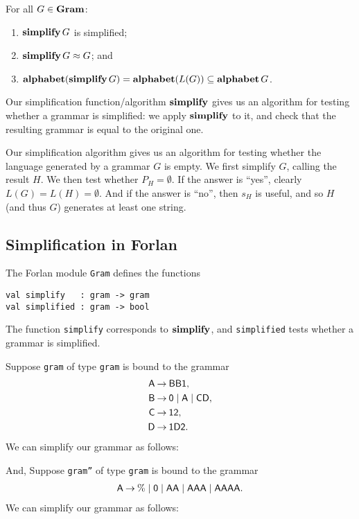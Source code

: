 \begin{theorem}
For all $G\in\mathbf{Gram}$:
\begin{enumerate}[\quad(1)]
\item $\mathbf{simplify}\,G$ is simplified;

\item $\mathbf{simplify}\,G\approx G$; and

\item $\mathbf{alphabet}(\mathbf{simplify}\,G) = \mathbf{alphabet}(L(G)) \subseteq\mathbf{alphabet}\,G$.
\end{enumerate}
\end{theorem}

Our simplification function/algorithm $\mathbf{simplify}$ gives us an
algorithm for testing whether a grammar is simplified: we apply
$\mathbf{simplify}$ to it, and check that the resulting grammar is equal to
the original one.

Our simplification algorithm gives us an algorithm for testing whether
the language generated by a grammar $G$ is empty. We first simplify $G$,
calling the result $H$. We then test whether $P_H=\emptyset$.  If
the answer is ``yes'', clearly $L(G)=L(H)=\emptyset$. And if the
answer is ``no'', then $s_H$ is useful, and so $H$ (and thus $G$) generates
at least one string.

\subsection{Simplification in Forlan}

The Forlan module \texttt{Gram} defines the functions
\begin{verbatim}
val simplify   : gram -> gram
val simplified : gram -> bool
\end{verbatim}
%
%
The function \texttt{simplify} corresponds to $\mathbf{simplify}$, and
\texttt{simplified} tests whether a grammar is simplified.

Suppose \texttt{gram} of type \texttt{gram} is bound to the grammar
\begin{align*}
\mathsf{A} &\mathbin{\to} \mathsf{BB1}, \\
\mathsf{B} &\mathbin{\to} \mathsf{0}\mid\mathsf{A}\mid\mathsf{C}\mathsf{D}, \\
\mathsf{C} &\mathbin{\to} \mathsf{1}\mathsf{2} , \\
\mathsf{D} &\mathbin{\to} \mathsf{1}\mathsf{D}\mathsf{2} .
\end{align*}
We can simplify our grammar as follows:

And, Suppose \texttt{gram''} of type \texttt{gram} is bound to the grammar
\begin{align*}
\mathsf{A} \mathbin{\to} \% \mid \mathsf{0} \mid \mathsf{AA} \mid \mathsf{AAA} \mid
\mathsf{AAAA} .
\end{align*}
We can simplify our grammar as follows:


